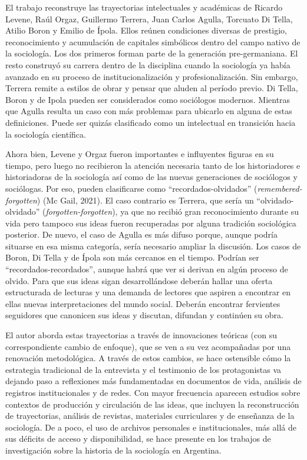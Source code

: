 El trabajo reconstruye las trayectorias intelectuales y académicas de Ricardo Levene, Raúl Orgaz, Guillermo Terrera, Juan Carlos Agulla, Torcuato Di Tella, Atilio Boron y Emilio de Ípola. Ellos reúnen condiciones diversas de prestigio, reconocimiento y acumulación de capitales simbólicos dentro del campo nativo de la sociología. Los dos primeros forman parte de la generación pre-germaniana. El resto construyó su carrera dentro de la disciplina cuando la sociología ya había avanzado en su proceso de institucionalización y profesionalización. Sin embargo, Terrera remite a estilos de obrar y pensar que aluden al período previo. Di Tella, Boron y de Ipola pueden ser considerados como sociólogos modernos. Mientras que Agulla resulta un caso con más problemas para ubicarlo en alguna de estas definiciones. Puede ser quizás clasificado como un intelectual en transición hacia la sociología científica.

Ahora bien, Levene y Orgaz fueron importantes e influyentes figuras en su tiempo, pero luego no recibieron la atención necesaria tanto de los historiadores e historiadoras de la sociología así como de las nuevas generaciones de sociólogos y sociólogas. Por eso, pueden clasificarse como \enquote{recordados-olvidados} (\emph{remembered- forgotten}) \parencite{280-BARGHEER2024}(Mc Gail, 2021). El caso contrario es Terrera, que sería un \enquote{olvidado-olvidado} (\emph{forgotten-forgotten}), ya que no recibió gran reconocimiento durante su vida pero tampoco sus ideas fueron recuperadas por alguna tradición sociológica posterior. De nuevo, el caso de Agulla es más difuso porque, aunque podría situarse en esa misma categoría, sería necesario ampliar la discusión. Los casos de Boron, Di Tella y de Ípola son más cercanos en el tiempo. Podrían ser \enquote{recordados-recordados}, aunque habrá que ver si derivan en algún proceso de olvido. Para que sus ideas sigan desarrollándose deberán hallar una oferta estructurada de lecturas y una demanda de lectores que aspiren a encontrar en ellas nuevas interpretaciones del mundo social. Deberán encontrar fervientes seguidores que canonicen sus ideas y discutan, difundan y continúen su obra.

El autor aborda estas trayectorias a través de innovaciones teóricas (con su correspondiente cambio de enfoque), que se ven a su vez acompañadas por una renovación metodológica. A través de estos cambios, se hace ostensible cómo la estrategia tradicional de la entrevista y el testimonio de los protagonistas va dejando paso a reflexiones más fundamentadas en documentos de vida, análisis de registros institucionales y de redes. Con mayor frecuencia aparecen estudios sobre contextos de producción y circulación de las ideas, que incluyen la reconstrucción de trayectorias, análisis de revistas, materiales curriculares y de enseñanza de la sociología. De a poco, el uso de archivos personales e institucionales, más allá de sus déficits de acceso y disponibilidad, se hace presente en los trabajos de investigación sobre la historia de la sociología en Argentina.

